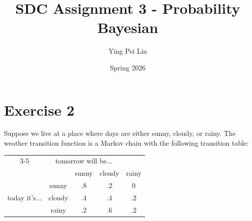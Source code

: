 \documentclass{article}
\begin{document}
\title{
  \textbf{SDC Assignment 3 - Probability Bayesian}
}
\author{Ying Pei Lin}
\date{Spring 2026}

\maketitle

\section*{Exercise 2}

Suppose we live at a place where days are either sunny, cloudy, or rainy.
The weather transition function is a Markov chain with the following transition table:

\begin{center}
\begin{tabular}{|cc|ccc|}
\cline{3-5}
 \multicolumn{2}{c|}{} & \multicolumn{3}{c|}{tomorrow will be...} \\ %
 \multicolumn{2}{c|}{} & sunny & cloudy & rainy \\
\hline
\multirow{3}{*}{today it's...}
& sunny  & .8 & .2 & 0 \\
& cloudy & .4 & .4 & .2 \\
& rainy  & .2 & .6 & .2 \\
\hline
\end{tabular}
\end{center}
\end{document}
